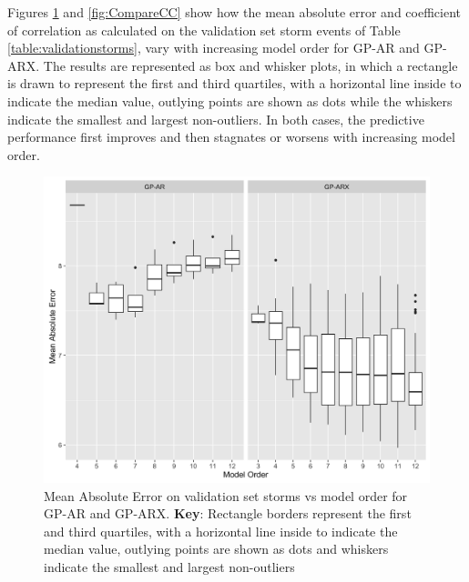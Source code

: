 \documentclass{article}
\begin{document}
Figures \ref{fig:CompareMae} and \ref{fig:CompareCC} show how the mean absolute error and coefficient of correlation as calculated on the validation set storm events of Table \ref{table:validationstorms}, vary with increasing model order for GP-AR and GP-ARX. The results are represented as box and whisker plots, in which a rectangle is drawn to represent the first and third quartiles, with a horizontal line inside to indicate the median value, outlying points are shown as dots while the whiskers indicate the smallest and largest non-outliers. In both cases, the predictive performance first improves and then stagnates or worsens with increasing model order. 

\begin{figure}[h]
\includegraphics[width=\textwidth]{Compare-mae.png}
\caption{Mean Absolute Error on validation set storms vs model order for GP-AR and GP-ARX. \textbf{Key}: Rectangle borders represent the first and third quartiles, with a horizontal line inside to indicate the median value, outlying points are shown as dots and whiskers indicate the smallest and largest non-outliers}
\label{fig:CompareMae}
\end{figure}
\end{document}
